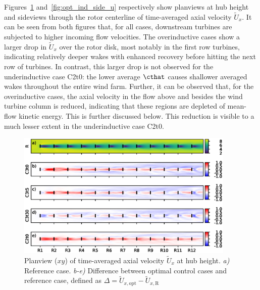 	Figures~\ref{fig:opt_ind_top_u} and~\ref{fig:opt_ind_side_u} respectively show planviews at hub height and sideviews through the rotor
	centerline of time-averaged axial velocity ${\widetilde{U}}_x$. It can be seen from both figures that, for all cases, downstream
	turbines are subjected to higher incoming flow velocities. The overinductive cases show a larger drop in $\widetilde{U}_x$ over the
	rotor disk, most notably in the first row turbines, indicating relatively deeper wakes with enhanced recovery before hitting the next row of
	turbines. In contrast, this larger drop is not observed for the underinductive case C2t0: the lower average $\cthat$ causes shallower averaged
	wakes throughout the entire wind farm. Further, it can be observed that, for the overinductive cases, the axial velocity in the flow above and
	besides the wind turbine column is reduced, indicating that these regions are depleted of mean-flow kinetic energy. This is further discussed
	below. This reduction is visible to a much lesser extent in the underinductive case C2t0.
	
	\begin{figure}[ht]
		\centering
		\includegraphics[width=0.93\textwidth]{chapters/optimal_induction_control/topview_u.eps}
		\caption[Planview ($xy$) of time-averaged axial velocity $\widetilde{U}_x$ at hub height.]{Planview ($xy$) of time-averaged axial velocity $\widetilde{U}_x$ at hub height. \emph{a) } Reference case. \emph{b-e)} Difference between optimal control cases and reference case, defined as $\Delta = \widetilde{U}_{x,\text{opt}} - \widetilde{U}_{x,\text{R}}$  \label{fig:opt_ind_top_u}}
	\end{figure}

